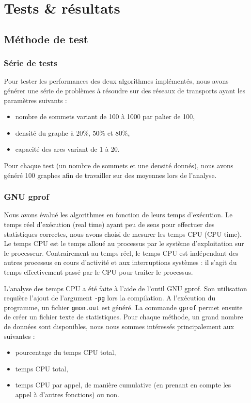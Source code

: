 \section{Tests \& résultats}

\subsection{Méthode de test}

\subsubsection{Série de tests}
Pour tester les performances des deux algorithmes implémentés, nous avons générer une série de problèmes à résoudre sur des réseaux de transports ayant les paramètres suivants :
\begin{itemize}
\item nombre de sommets variant de 100 à 1000 par palier de 100,
\item densité du graphe à 20\%, 50\% et 80\%,
\item capacité des arcs variant de 1 à 20.
\end{itemize}
Pour chaque test (un nombre de sommets et une densité donnés), nous avons généré 100 graphes afin de travailler sur des moyennes lors de l'analyse.

\subsubsection{GNU gprof}
Nous avons évalué les algorithmes en fonction de leurs temps d'exécution. Le temps réel d'exécution (real time) ayant peu de sens pour effectuer des statistiques correctes, nous avons choisi de mesurer les temps CPU (CPU time). Le temps CPU est le temps alloué au processus par le système d'exploitation sur le processeur. Contrairement au temps réel, le temps CPU est indépendant des autres processus en cours d'activité et aux interruptions systèmes : il s'agit du temps effectivement passé par le CPU pour traiter le processus.

L'analyse des temps CPU a été faite à l'aide de l'outil GNU gprof. Son utilisation requière l'ajout de l'argument \texttt{-pg} lors la compilation. A l'exécution du programme, un fichier \texttt{gmon.out} est généré. La commande \texttt{gprof} permet ensuite de créer un fichier texte de statistiques. Pour chaque méthode, un grand nombre de données sont disponibles, nous nous sommes intéressés principalement aux suivantes :
\begin{itemize}
\item pourcentage du temps CPU total,
\item temps CPU total,
\item temps CPU par appel, de manière cumulative (en prenant en compte les appel à d'autres fonctions) ou non.
\end{itemize}

